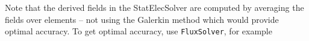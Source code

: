 Note that the derived fields in the StatElecSolver are computed 
by averaging the fields over elements -- not using the 
Galerkin method which would provide optimal accuracy. To get optimal accuracy, use 
\texttt{FluxSolver}, for example


\hfill



